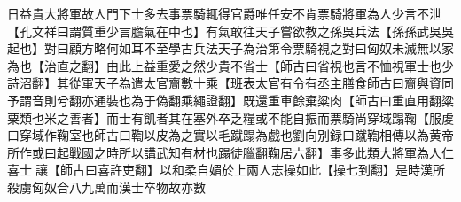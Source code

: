 日益貴大將軍故人門下士多去事票騎輒得官爵唯任安不肯票騎將軍為人少言不泄【孔文祥曰謂質重少言膽氣在中也】有氣敢往天子嘗欲教之孫吳兵法【孫孫武吳吳起也】對曰顧方略何如耳不至學古兵法天子為治第令票騎視之對曰匈奴未滅無以家為也【治直之翻】由此上益重愛之然少貴不省士【師古曰省視也言不恤視軍士也少詩沼翻】其從軍天子為遣太官齎數十乘【班表太官有令有丞主膳食師古曰齎與資同予謂音則兮翻亦通裝也為于偽翻乘繩證翻】既還重車餘棄粱肉【師古曰重直用翻粱粟類也米之善者】而士有飢者其在塞外卒乏糧或不能自振而票騎尚穿域蹋鞠【服䖍曰穿域作鞠室也師古曰鞫以皮為之實以毛蹴蹋為戲也劉向别録曰蹴鞫相傳以為黄帝所作或曰起戰國之時所以講武知有材也蹋徒臘翻鞠居六翻】事多此類大將軍為人仁喜士讓【師古曰喜許吏翻】以和柔自媚於上兩人志操如此【操七到翻】是時漢所殺虜匈奴合八九萬而漢士卒物故亦數